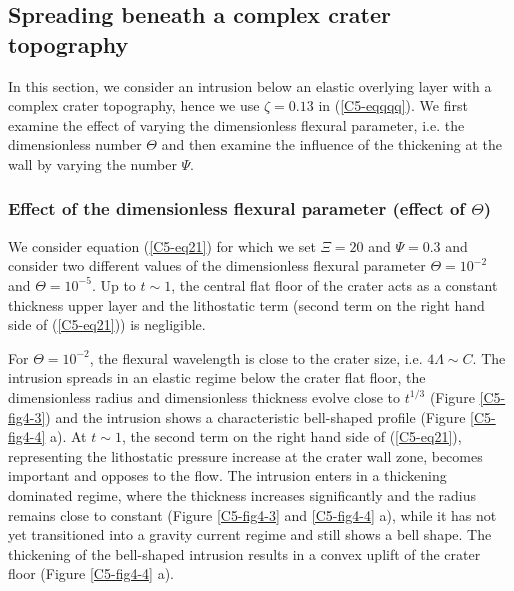 \subsection{Spreading beneath a complex crater topography}
		
In this section,  we consider an intrusion below  an elastic overlying
layer with a  complex crater topography, hence we  use $\zeta=0.13$ in
(\ref{C5-eqqqq}).   We  first  examine   the  effect  of  varying  the
dimensionless  flexural  parameter,  i.e.   the  dimensionless  number
$\Theta$ and then examine the influence  of the thickening at the wall
by varying the number $\Psi$.
	
\subsubsection{Effect of the  dimensionless flexural parameter (effect
  of $\Theta$)}
		
We consider  equation (\ref{C5-eq21})  for which  we set  $\Xi=20$ and
$\Psi=0.3$  and consider  two  different values  of the  dimensionless
flexural  parameter  $\Theta=10^{-2}$  and  $\Theta=10^{-5}$.   Up  to
$t\sim1$, the  central flat  floor of  the crater  acts as  a constant
thickness upper  layer and  the lithostatic term  (second term  on the
right hand side of (\ref{C5-eq21})) is negligible.
	
For $\Theta=10^{-2}$, the  flexural wavelength is close  to the crater
size, i.e.   $4\Lambda \sim C$.   The intrusion spreads in  an elastic
regime  below the  crater  flat floor,  the  dimensionless radius  and
dimensionless   thickness   evolve    close   to   $t^{1/3}$   (Figure
\ref{C5-fig4-3}) and the intrusion  shows a characteristic bell-shaped
profile (Figure  \ref{C5-fig4-4} a). At  $t\sim1$, the second  term on
the right  hand side of (\ref{C5-eq21}),  representing the lithostatic
pressure  increase at  the  crater wall  zone,  becomes important  and
opposes to  the flow. The  intrusion enters in a  thickening dominated
regime,  where the  thickness increases  significantly and  the radius
remains close to constant  (Figure \ref{C5-fig4-3} and \ref{C5-fig4-4}
a), while  it has not yet  transitioned into a gravity  current regime
and  still shows  a bell  shape.   The thickening  of the  bell-shaped
intrusion  results in  a convex  uplift  of the  crater floor  (Figure
\ref{C5-fig4-4} a).
		
